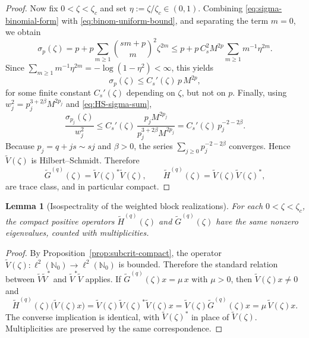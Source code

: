 \documentclass[11pt]{amsart}
\numberwithin{equation}{section}
\theoremstyle{plain}
\newtheorem{lemma}[theorem]{Lemma}
\theoremstyle{definition}
\theoremstyle{remark}
\newcommand{\NN}{\mathbb{N}}
\begin{document}
\begin{proof}
	Now fix \(0<\zeta<\zeta_c\) and set \(\eta:=\zeta/\zeta_c\in(0,1)\).
	Combining \eqref{eq:sigma-binomial-form} with
	\eqref{eq:binom-uniform-bound}, and separating the term \(m=0\), we obtain
	\[
		\sigma_p(\zeta)
		=
		p+p\sum_{m\ge1}\binom{sm+p}{m}^2\zeta^{2m}
		\le
		p+p\,C_s^2M^{2p}\sum_{m\ge1}m^{-1}\eta^{2m}.
	\]
	Since \(\sum_{m\ge1}m^{-1}\eta^{2m}=-\log(1-\eta^2)<\infty\), this yields
	\begin{equation}\label{eq:sigma-subcritical-bound}
		\sigma_p(\zeta)\le C_s'(\zeta)\,p\,M^{2p},
	\end{equation}
	for some finite constant \(C_s'(\zeta)\) depending on \(\zeta\), but not on
	\(p\). Finally, using \(w_j^2=p_j^{3+2\beta}M^{2p_j}\) and
	\eqref{eq:HS-sigma-sum},
	\[
		\frac{\sigma_{p_j}(\zeta)}{w_j^2}
		\le
		C_s'(\zeta)\,\frac{p_jM^{2p_j}}{p_j^{3+2\beta}M^{2p_j}}
		=
		C_s'(\zeta)\,p_j^{-2-2\beta}.
	\]
	Because \(p_j=q+js\sim sj\) and \(\beta>0\), the series
	\(\sum_{j\ge0}p_j^{-2-2\beta}\) converges. Hence
	\(\widetilde V(\zeta)\) is Hilbert--Schmidt. Therefore
	\[
		\widetilde G^{(q)}(\zeta)=\widetilde V(\zeta)^*\widetilde V(\zeta),
		\qquad
		\widetilde H^{(q)}(\zeta)=\widetilde V(\zeta)\widetilde V(\zeta)^*,
	\]
	are trace class, and in particular compact.
\end{proof}

\begin{lemma}[Isospectrality of the weighted block realizations]
	\label{lem:block-isospectral}
	For each \(0<\zeta<\zeta_c\), the compact positive operators
	\(\widetilde H^{(q)}(\zeta)\) and \(\widetilde G^{(q)}(\zeta)\) have the
	same nonzero eigenvalues, counted with multiplicities.
\end{lemma}

\begin{proof}
	By Proposition~\ref{prop:subcrit-compact}, the operator
	\(\widetilde V(\zeta):\ell^2(\NN_0)\to\ell^2(\NN_0)\) is bounded.
	Therefore the standard relation between \(\widetilde V\widetilde V^*\) and
	\(\widetilde V^*\widetilde V\) applies. If
	\(\widetilde G^{(q)}(\zeta)x=\mu\,x\) with \(\mu>0\), then
	\(\widetilde V(\zeta)x\neq0\) and
	\[
		\widetilde H^{(q)}(\zeta)\bigl(\widetilde V(\zeta)x\bigr)
		=
		\widetilde V(\zeta)\widetilde V(\zeta)^*\widetilde V(\zeta)x
		=
		\widetilde V(\zeta)\widetilde G^{(q)}(\zeta)x
		=
		\mu\,\widetilde V(\zeta)x.
	\]
	The converse implication is identical, with \(\widetilde V(\zeta)^*\) in
	place of \(\widetilde V(\zeta)\). Multiplicities are preserved by the same
	correspondence.
\end{proof}
\end{document}
